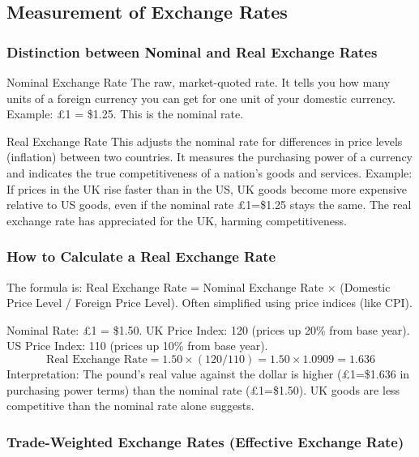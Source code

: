 \documentclass[11pt, a4paper, twoside]{book}
\begin{document}
\subsection{Measurement of Exchange Rates}

\subsubsection{Distinction between Nominal and Real Exchange Rates}

\begin{keyterm}{Nominal Exchange Rate}
The raw, market-quoted rate. It tells you how many units of a foreign currency you can get for one unit of your domestic currency. Example: £1 = \$1.25. This is the nominal rate.
\end{keyterm}

\begin{keyterm}{Real Exchange Rate}
This adjusts the nominal rate for differences in price levels (inflation) between two countries. It measures the purchasing power of a currency and indicates the true competitiveness of a nation's goods and services. Example: If prices in the UK rise faster than in the US, UK goods become more expensive relative to US goods, even if the nominal rate £1=\$1.25 stays the same. The real exchange rate has appreciated for the UK, harming competitiveness.
\end{keyterm}

\subsubsection{How to Calculate a Real Exchange Rate}

The formula is: Real Exchange Rate = Nominal Exchange Rate $\times$ (Domestic Price Level / Foreign Price Level). Often simplified using price indices (like CPI).

\begin{example}
Nominal Rate: £1 = \$1.50. UK Price Index: 120 (prices up 20\% from base year). US Price Index: 110 (prices up 10\% from base year).
\[ \text{Real Exchange Rate} = 1.50 \times (120 / 110) = 1.50 \times 1.0909 = 1.636 \]
Interpretation: The pound's real value against the dollar is higher (£1=\$1.636 in purchasing power terms) than the nominal rate (£1=\$1.50). UK goods are less competitive than the nominal rate alone suggests.
\end{example}

\subsubsection{Trade-Weighted Exchange Rates (Effective Exchange Rate)}
\end{document}
